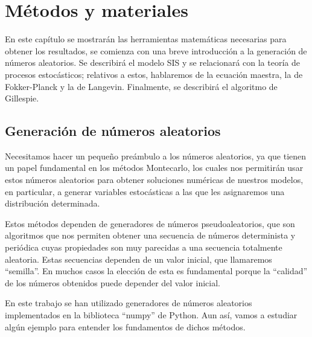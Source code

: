 \chapter{Métodos y materiales}

En este capítulo se mostrarán las herramientas matemáticas necesarias para obtener los resultados, se comienza con 
una breve introducción a la generación de números aleatorios. Se describirá el modelo SIS y se relacionará con la teoría de procesos estocásticos;
relativos a estos, hablaremos de la ecuación maestra, la de Fokker-Planck y la de Langevin. Finalmente, se describirá el 
algoritmo de Gillespie.

\section{Generación de números aleatorios}

Necesitamos hacer un pequeño preámbulo a los números aleatorios, ya que tienen un papel fundamental en los métodos Montecarlo, los cuales nos 
permitirán usar estos números aleatorios para obtener soluciones numéricas de nuestros modelos, en particular, a generar variables 
estocásticas a las que les asignaremos una distribución determinada.

Estos métodos dependen de generadores de números pseudoaleatorios, que son algoritmos que nos permiten obtener una secuencia de números
determinista y periódica cuyas propiedades son muy parecidas a una secuencia totalmente aleatoria. Estas secuencias dependen de un valor
inicial, que llamaremos ``semilla''. En muchos casos la elección de esta es fundamental porque la ``calidad'' de los números obtenidos
puede depender del valor inicial.

En este trabajo se han utilizado generadores de números aleatorios implementados en la biblioteca ``numpy''  de Python. Aun así, vamos a 
estudiar algún ejemplo para entender los fundamentos de dichos métodos.

\newpage

